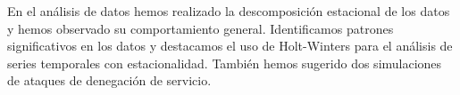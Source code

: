 En el análisis de datos hemos realizado la descomposición estacional de los datos y hemos observado su comportamiento general. Identificamos patrones significativos en los datos y destacamos el uso de Holt-Winters para el análisis de series temporales con estacionalidad. 
También hemos sugerido dos simulaciones de ataques de denegación de servicio.